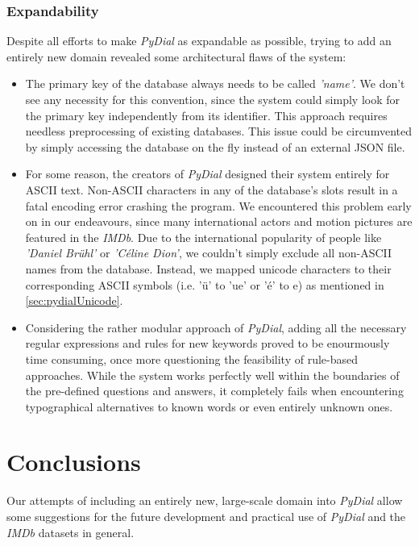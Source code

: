 \documentclass[11pt,a4paper]{article}
\begin{document}
	\subsubsection{Expandability}
	\label{sec:pydialLimits-expandability}
	Despite all efforts to make \textit{PyDial} as expandable as possible, trying to add an entirely new domain revealed some architectural flaws of the system:
\begin{itemize}
	\item The primary key of the database always needs to be called \emph{'name'}. We don't see any necessity for this convention, since the system could simply look for the primary key independently from its identifier. This approach requires needless preprocessing of existing databases. This issue could be circumvented by simply accessing the database on the fly instead of an external JSON file.
	\item For some reason, the creators of \textit{PyDial} designed their system entirely for ASCII text. Non-ASCII characters in any of the database's slots result in a fatal encoding error crashing the program. We encountered this problem early on in our endeavours, since many international actors and motion pictures are featured in the \textit{IMDb}. Due to the international popularity of people like \emph{'Daniel Brühl'} or \emph{'Céline Dion'}, we couldn't simply exclude all non-ASCII names from the database. Instead, we mapped unicode characters to their corresponding ASCII symbols (i.e. 'ü' to 'ue' or 'é' to e) as mentioned in \ref{sec:pydialUnicode}.
	\item Considering the rather modular approach of \textit{PyDial}, adding all the necessary regular expressions and rules for new keywords proved to be enourmously time consuming, once more questioning the feasibility of rule-based approaches. While the system works perfectly well within the boundaries of the pre-defined questions and answers, it completely fails when encountering typographical alternatives to known words or even entirely unknown ones. 
\end{itemize}	 

\section{Conclusions}
\label{sec:conclusion}

Our attempts of including an entirely new, large-scale domain into \textit{PyDial} allow some suggestions for the future development and practical use of \textit{PyDial} and the \textit{IMDb} datasets in general.  
\end{document}
